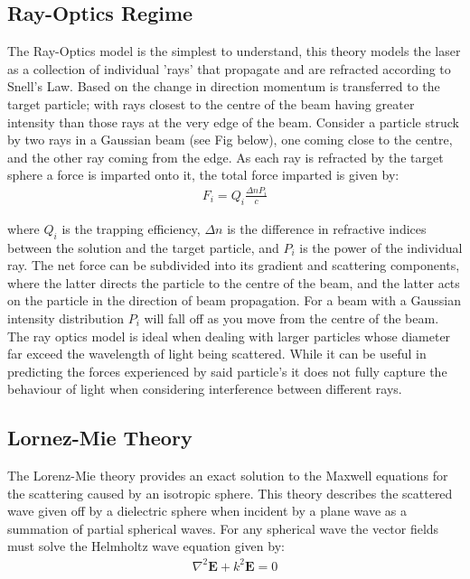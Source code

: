 \subsection{Ray-Optics Regime}

The Ray-Optics model is the simplest to understand, this theory models 
the laser as a collection of individual 'rays' that propagate and are 
refracted according to Snell's Law. Based on the change in direction 
momentum is transferred to the target particle; with rays closest to 
the centre of the beam having greater intensity than those rays at 
the very edge of the beam. Consider a particle struck by two rays in 
a Gaussian beam (see Fig below), one coming close to the centre, and 
the other ray coming from the edge. As each ray is refracted by the 
target sphere a force is imparted onto it, the total force imparted 
is given by:
\begin{align}
	F_i = Q_i\frac{\Delta n P_i}{c}
\end{align}

where $Q_i$ is the trapping efficiency, $\Delta n$ is the difference
in refractive indices between the solution and the target particle,
and $P_i$ is the power of the individual ray. The net force can be 
subdivided into its gradient and scattering components, where the latter
directs the particle to the centre of the beam, and the latter acts on 
the particle in the direction of beam propagation. For a beam with a
Gaussian intensity distribution $P_i$ will fall off as you move from
the centre of the beam. The ray optics model is ideal when dealing 
with larger particles whose diameter far exceed the wavelength of light
being scattered. While it can be useful in predicting the forces 
experienced by said particle's it does not fully capture the behaviour
of light when considering interference between different rays.


\subsection{Lornez-Mie Theory}

The Lorenz-Mie theory provides an exact solution to the Maxwell equations 
for the scattering caused by an isotropic sphere. This theory describes the 
scattered wave given off by a dielectric sphere when incident by a plane 
wave as a summation of partial spherical waves. For any spherical wave the 
vector fields must solve the Helmholtz wave equation given by:
\begin{align}
	\nabla^2\mathbf{E} +k^2\mathbf{E} = 0
\end{align} 

